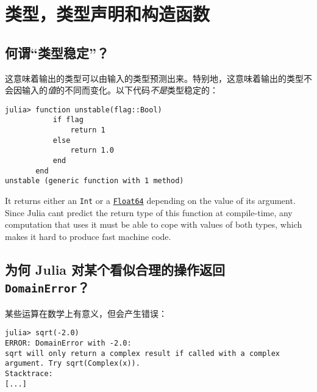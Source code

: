 \hypertarget{5608144491570256308}{}


\section{类型，类型声明和构造函数}



\hypertarget{11170875837665758023}{}


\subsection{何谓“类型稳定”？}



这意味着输出的类型可以由输入的类型预测出来。特别地，这意味着输出的类型不会因输入的\emph{值}的不同而变化。以下代码\emph{不是}类型稳定的：




\begin{verbatim}
julia> function unstable(flag::Bool)
           if flag
               return 1
           else
               return 1.0
           end
       end
unstable (generic function with 1 method)
\end{verbatim}



It returns either an \texttt{Int} or a \hyperlink{5027751419500983000}{\texttt{Float64}} depending on the value of its argument. Since Julia can{\textquotesingle}t predict the return type of this function at compile-time, any computation that uses it must be able to cope with values of both types, which makes it hard to produce fast machine code.



\hypertarget{6904365807459053438}{}


\subsection{为何 Julia 对某个看似合理的操作返回 \texttt{DomainError}？}



某些运算在数学上有意义，但会产生错误：




\begin{verbatim}
julia> sqrt(-2.0)
ERROR: DomainError with -2.0:
sqrt will only return a complex result if called with a complex argument. Try sqrt(Complex(x)).
Stacktrace:
[...]
\end{verbatim}



